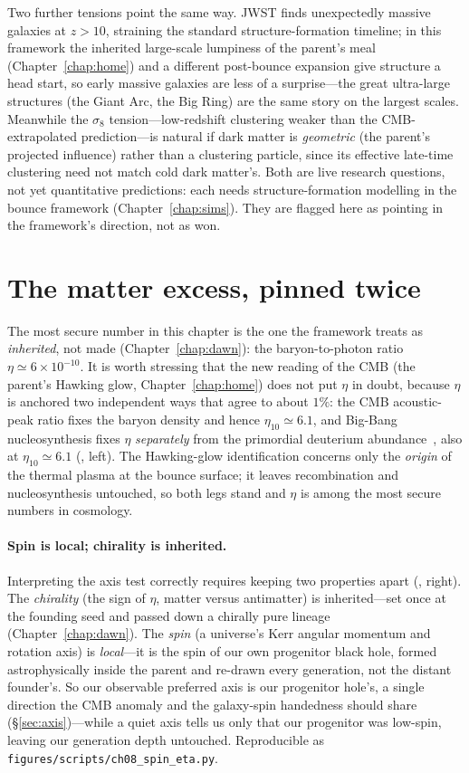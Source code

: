 Two further tensions point the same way. JWST finds unexpectedly massive galaxies
at $z>10$, straining the standard structure-formation timeline; in this framework
the inherited large-scale lumpiness of the parent's meal (Chapter~\ref{chap:home})
and a different post-bounce expansion give structure a head start, so early massive
galaxies are less of a surprise---the great ultra-large structures (the Giant Arc,
the Big Ring) are the same story on the largest scales. Meanwhile the $\sigma_8$
tension---low-redshift clustering weaker than the CMB-extrapolated prediction---is
natural if dark matter is \emph{geometric} (the parent's projected influence) rather
than a clustering particle, since its effective late-time clustering need not match
cold dark matter's. Both are live research questions, not yet quantitative
predictions: each needs structure-formation modelling in the bounce framework
(Chapter~\ref{chap:sims}). They are flagged here as pointing in the framework's
direction, not as won.

\section{The matter excess, pinned twice}
\label{sec:spin-local}

The most secure number in this chapter is the one the framework treats as
\emph{inherited}, not made (Chapter~\ref{chap:dawn}): the baryon-to-photon ratio
$\eta\simeq6\times10^{-10}$. It is worth stressing that the new reading of the CMB
(the parent's Hawking glow, Chapter~\ref{chap:home}) does not put $\eta$ in doubt,
because $\eta$ is anchored two independent ways that agree to about $1\%$: the CMB
acoustic-peak ratio fixes the baryon density and hence $\eta_{10}\simeq6.1$, and
Big-Bang nucleosynthesis fixes $\eta$ \emph{separately} from the primordial
deuterium abundance~\citep{cooke2018}, also at $\eta_{10}\simeq6.1$
(, left). The Hawking-glow identification concerns only the
\emph{origin} of the thermal plasma at the bounce surface; it leaves recombination
and nucleosynthesis untouched, so both legs stand and $\eta$ is among the most
secure numbers in cosmology.

\paragraph{Spin is local; chirality is inherited.} Interpreting the axis test
correctly requires keeping two properties apart (, right). The
\emph{chirality} (the sign of $\eta$, matter versus antimatter) is inherited---set
once at the founding seed and passed down a chirally pure lineage
(Chapter~\ref{chap:dawn}). The \emph{spin} (a universe's Kerr angular momentum and
rotation axis) is \emph{local}---it is the spin of our own progenitor black hole,
formed astrophysically inside the parent and re-drawn every generation, not the
distant founder's. So our observable preferred axis is our progenitor hole's, a
single direction the CMB anomaly and the galaxy-spin handedness should share
(\S\ref{sec:axis})---while a quiet axis tells us only that our progenitor was
low-spin, leaving our generation depth untouched. Reproducible as
\texttt{figures/scripts/ch08\_spin\_eta.py}.

